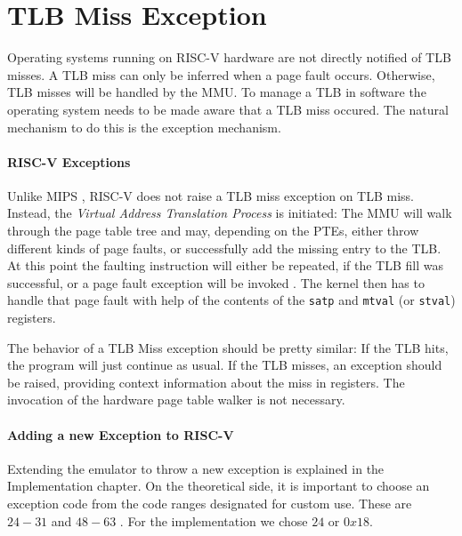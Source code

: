 \section{TLB Miss Exception}
Operating systems running on RISC-V hardware are not directly notified of TLB misses.
A TLB miss can only be inferred when a page fault occurs. Otherwise, TLB misses will be handled
by the MMU.
To manage a TLB in software the operating system needs to be made aware that a TLB miss occured.
The natural mechanism to do this is the exception mechanism.

\paragraph{RISC-V Exceptions}
Unlike MIPS \cite{heiserAnatomyHighPerformanceMicrokernel}, RISC-V does not raise a TLB miss exception on TLB miss.
Instead, the \emph{Virtual Address Translation Process} is initiated: The MMU will walk through
the page table tree and may, depending on the PTEs, either throw different kinds of page faults, or
successfully add the missing entry to the TLB.
At this point the faulting instruction will either be repeated, if the TLB fill was successful, or
a page fault exception will be invoked \cite{RISCVInstructionSet}. The kernel then has to handle that page fault with help
of the contents of the \texttt{satp} and \texttt{mtval} (or \texttt{stval}) registers.

The behavior of a TLB Miss exception should be pretty similar: If the TLB hits, the program will
just continue as usual. If the TLB misses, an exception should be raised, providing context
information about the miss in registers. The invocation of the hardware page table walker is
not necessary.


\paragraph{Adding a new Exception to RISC-V}
Extending the emulator to throw a new exception is explained in the Implementation chapter.
On the theoretical side, it is important to choose an exception code from the code ranges designated
for custom use. These are $24-31$ and $48-63$ \cite{RISCVInstructionSet}. For the implementation we chose $24$ or $0x18$.




